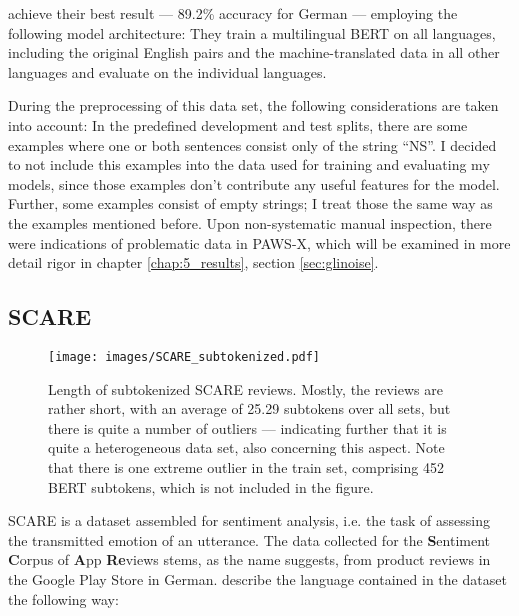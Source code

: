 
\cite{yang2019paws} achieve their best result --- 89.2\% accuracy for German --- employing the
following model architecture:
They train a multilingual BERT on all languages, including the original English pairs and the
machine-translated data in all other languages and evaluate on the individual languages.

During the preprocessing of this data set, the following considerations are taken into account: In
the predefined development and test splits, there are some examples where one or both sentences
consist only of the string ``NS''. I decided to not include this examples into the data used for
training and evaluating my models, since those examples don't contribute any useful features for
the model. Further, some examples consist of
empty strings; I treat those the same way as the examples mentioned before. Upon non-systematic
manual inspection, there were indications of problematic data in PAWS-X, which will be examined in
more detail rigor in chapter \ref{chap:5_results}, section \ref{sec:glinoise}.


\subsection{SCARE}

\begin{wrapfigure}[24]{r}{0.45\linewidth}
  \centering
    \texttt{[image: images/SCARE\_subtokenized.pdf]}
  \label{fig:scare-subtokenized}
  \caption[SCARE Lengths]{Length of subtokenized SCARE reviews. Mostly, the reviews are rather
    short, with an average of 25.29 subtokens over all sets, but there is quite a number of
    outliers --- indicating further that it is quite a heterogeneous data set, also concerning
    this aspect. Note that there is one extreme outlier in the train set, comprising 452 BERT
    subtokens, which is not included in the figure.}
\end{wrapfigure}

SCARE is a dataset assembled for sentiment analysis, i.e. the task of assessing the
transmitted emotion of an utterance. The data collected for the \textbf{S}entiment
\textbf{C}orpus of \textbf{A}pp \textbf{Re}views stems, as the name suggests, from
product reviews in the Google Play Store in German. \cite{sanger2016scare} describe
the language contained in the dataset the following way:

